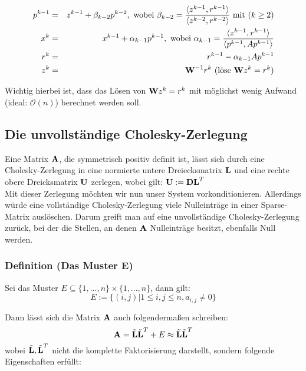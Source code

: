 \begin{eqnarray}
p^{k-1} &=& z^{k-1} + \beta_{k-2}p^{k-2}, \textnormal{ wobei } \beta_{k-2} = \frac {\langle z^{k-1}, r^{k-1} \rangle} {\langle z^{k-2}, r^{k-2} \rangle} \textnormal{ mit } (k \ge 2) \notag \\
x^{k} &=& x^{k-1} + \alpha_{k-1}p^{k-1}, \textnormal{ wobei } \alpha_{k-1} = \frac {\langle z^{k-1}, r^{k-1} \rangle} {\langle p^{k-1}, Ap^{k-1} \rangle} \notag \\
r^{k} &=& r^{k-1} - \alpha_{k-1}Ap^{k-1} \notag \\
z^{k} &=& {\textbf{W}}^{-1}r^{k} \textnormal{ (löse } {\textbf{W}}z^{k} = r^{k}) \notag
\end{eqnarray}

Wichtig hierbei ist, dass das Lösen von ${\textbf{W}}z^{k} = r^{k}$ mit möglichst wenig Aufwand (ideal: $\mathcal{O}(n)$) berechnet werden soll.

\subsection{Die unvollständige Cholesky-Zerlegung}\label{ss.ICCG}

Eine Matrix ${\textbf{A}}$, die symmetrisch positiv definit ist, lässt sich durch eine Cholesky-Zerlegung in eine normierte untere Dreiecksmatrix ${\textbf{L}}$ und eine rechte obere Dreicksmatrix ${\textbf{U}}$ zerlegen, wobei gilt: ${\textbf{U}} := {\textbf{D}}{\textbf{L}}^{T}$ \\
Mit dieser Zerlegung möchten wir nun unser System vorkonditionieren. Allerdings würde eine vollständige Cholesky-Zerlegung viele Nulleinträge in einer Sparse-Matrix auslöschen. Darum greift man auf eine unvollständige Cholesky-Zerlegung zurück, bei der die Stellen, an denen ${\textbf{A}}$ Nulleinträge besitzt, ebenfalls Null werden.

\subsubsection{Definition (Das Muster E)}

Sei das Muster $E \subseteq \{1,...,n\} \times \{1,...,n\}$, dann gilt:
\begin{equation}
E := \{(i,j) | 1 \le i,j \le n, a_{i,j} \ne 0 \}
\end{equation}

Dann lässt sich die Matrix ${\textbf{A}}$ auch folgendermaßen schreiben:
\begin{equation}
{\textbf{A}} = \tilde{{\textbf{L}}} \tilde{{\textbf{L}}}^{T} + E \approx \tilde{{\textbf{L}}} \tilde{{\textbf{L}}}^{T}
\end{equation}
wobei $\tilde{{\textbf{L}}}, \tilde{{\textbf{L}}}^{T}$ nicht die komplette Faktorisierung darstellt, sondern folgende Eigenschaften erfüllt:

